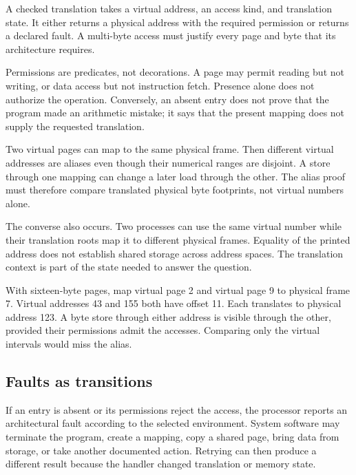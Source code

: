 \begin{definition}[title={Checked page translation}]
A checked translation takes a virtual address, an access kind, and translation
state. It either returns a physical address with the required permission or
returns a declared fault. A multi-byte access must justify every page and byte
that its architecture requires.
\end{definition}

Permissions are predicates, not decorations. A page may permit reading but
not writing, or data access but not instruction fetch. Presence alone does not
authorize the operation. Conversely, an absent entry does not prove that the
program made an arithmetic mistake; it says that the present mapping does not
supply the requested translation.

Two virtual pages can map to the same physical frame. Then different virtual
addresses are aliases even though their numerical ranges are disjoint. A store
through one mapping can change a later load through the other. The alias proof
must therefore compare translated physical byte footprints, not virtual
numbers alone.

The converse also occurs. Two processes can use the same virtual number while
their translation roots map it to different physical frames. Equality of the
printed address does not establish shared storage across address spaces. The
translation context is part of the state needed to answer the question.

\begin{example}[title={Virtual inequality, physical equality}]
With sixteen-byte pages, map virtual page 2 and virtual page 9 to physical
frame 7. Virtual addresses 43 and 155 both have offset 11. Each translates to
physical address 123. A byte store through either address is visible through
the other, provided their permissions admit the accesses. Comparing only the
virtual intervals would miss the alias.
\end{example}

\subsection{Faults as transitions}

If an entry is absent or its permissions reject the access, the processor
reports an architectural fault according to the selected environment. System
software may terminate the program, create a mapping, copy a shared page,
bring data from storage, or take another documented action. Retrying can then
produce a different result because the handler changed translation or memory
state.


